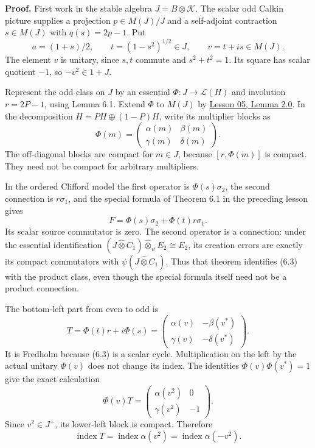 \documentclass[
  11pt,
]{article}
\begin{document}
\textbf{Proof.} First work in the stable algebra
\(J=B\otimes\mathcal K\). The scalar odd Calkin picture supplies a
projection \(p\in M(J)/J\) and a self-adjoint contraction \(s\in M(J)\)
with \(q(s)=2p-1\). Put \[
a=(1+s)/2,\qquad t=(1-s^2)^{1/2}\in J,\qquad v=t+is\in M(J).
\tag{6.2}
\] The element \(v\) is unitary, since \(s,t\) commute and
\(s^2+t^2=1\). Its square has scalar quotient \(-1\), so \(-v^2\in1+J\).

Represent the odd class on \(J\) by an essential
\(\Phi:J\to\mathcal L(H)\) and involution \(r=2P-1\), using Lemma 6.1.
Extend \(\Phi\) to \(M(J)\) by
\href{KT-KK-05.html\#lemma-2-0-compact-module-operators-and-their-multipliers}{Lesson
05, Lemma 2.0}. In the decomposition \(H=PH\oplus(1-P)H\), write its
multiplier blocks as \[
\Phi(m)=
\begin{pmatrix}\alpha(m)&\beta(m)\\
\gamma(m)&\delta(m)\end{pmatrix}.
\] The off-diagonal blocks are compact for \(m\in J\), because
\([r,\Phi(m)]\) is compact. They need not be compact for arbitrary
multipliers.

In the ordered Clifford model the first operator is \(\Phi(s)\sigma_2\),
the second connection is \(r\sigma_1\), and the special formula of
Theorem 6.1 in the preceding lesson gives \[
F=\Phi(s)\sigma_2+\Phi(t)r\sigma_1.
\tag{6.3}
\] Its scalar source commutator is zero. The second operator is a
connection: under the essential identification
\((J\widehat\otimes C_1)\widehat\otimes_\psi E_2\cong E_2\), its
creation errors are exactly its compact commutators with
\(\psi(J\widehat\otimes C_1)\). Thus that theorem identifies (6.3) with
the product class, even though the special formula itself need not be a
product connection.

The bottom-left part from even to odd is \[
T=\Phi(t)r+i\Phi(s)
=\begin{pmatrix}
\alpha(v)&-\beta(v^*)\\
\gamma(v)&-\delta(v^*)
\end{pmatrix}.
\tag{6.4}
\] It is Fredholm because (6.3) is a scalar cycle. Multiplication on the
left by the actual unitary \(\Phi(v)\) does not change its index. The
identities \(\Phi(v)\Phi(v^*)=1\) give the exact calculation \[
\Phi(v)T=
\begin{pmatrix}\alpha(v^2)&0\\
\gamma(v^2)&-1\end{pmatrix}.
\tag{6.5}
\] Since \(v^2\in J^+\), its lower-left block is compact. Therefore \[
\operatorname{index}T=\operatorname{index}\alpha(v^2)
=\operatorname{index}\alpha(-v^2).
\tag{6.6}
\]
\end{document}
